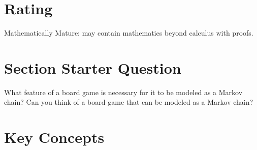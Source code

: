 \documentclass[12pt]{article}
\begin{document}
\myheader \mytitle

\hr


\hr

\usefirefox

\hr



\section*{Rating} %
Mathematically Mature:  may contain mathematics beyond calculus with
proofs.  %

\hr

\section*{Section Starter Question} What feature of a board game is
necessary for it to be modeled as a Markov chain?  Can you think of a
board game that can be modeled as a Markov chain?

\hr

\section*{Key Concepts}
\end{document}
